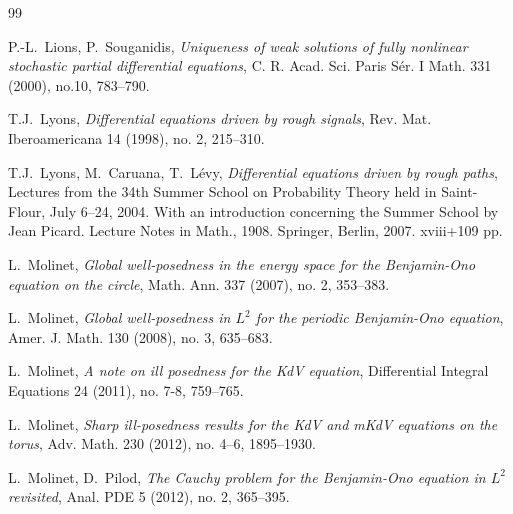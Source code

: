 \documentclass[letterpaper, 11pt,  reqno]{amsart}
\newcommand{\1}{\hspace{0.5mm}\text{I}\hspace{0.5mm}}
\numberwithin{equation}{section}
\numberwithin{theorem}{section}
\begin{document}
\begin{thebibliography}{99}


P.-L.~Lions, P.~Souganidis, 
{\it Uniqueness of weak solutions of fully nonlinear stochastic partial differential equations},
C. R. Acad. Sci. Paris S\'er. I Math. 331 (2000), no.10, 783--790.


T.J.~Lyons,
{\it Differential equations driven by rough signals},
Rev. Mat. Iberoamericana 14 (1998), no. 2, 215--310.




T.J.~Lyons, M.~Caruana, T.~L{\'e}vy,
{\it Differential equations driven by rough paths},
Lectures from the 34th Summer School on Probability Theory held in Saint-Flour, 
July 6--24, 2004. 
With an introduction concerning the Summer School by Jean Picard.
Lecture Notes in Math., 1908.
 Springer, Berlin, 2007. xviii+109 pp.


%
%
%


%
%
%
%



%
%



L.~Molinet, 
{\it Global well-posedness in the energy space for the Benjamin-Ono equation on the circle},
Math. Ann. 337 (2007), no. 2, 353--383. 


L.~Molinet, 
{\it Global well-posedness in $L^2$ for the periodic Benjamin-Ono equation}, 
Amer. J. Math. 130 (2008), no. 3, 635--683. 



L.~Molinet,
{\it A note on ill posedness for the KdV equation},
Differential Integral Equations 24 (2011), no. 7-8, 759--765.





L.~Molinet,
{\it Sharp ill-posedness results for the KdV and mKdV equations on the torus},
Adv. Math. 230 (2012), no. 4--6, 1895--1930.




L.~Molinet, D.~Pilod, 
{\it The Cauchy problem for the Benjamin-Ono equation in $L^2$ revisited},
 Anal. PDE 5 (2012), no. 2, 365--395. 




\end{thebibliography}
\end{document}
